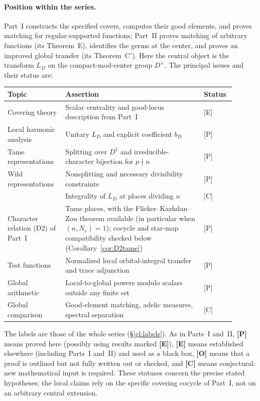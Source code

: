 \documentclass[11pt]{article}
\theoremstyle{plain}
\theoremstyle{definition}
\begin{document}
\paragraph{Position within the series.}
Part~I constructs the specified covers, computes their good elements, and
proves matching for regular-supported functions; Part~II proves matching of
arbitrary functions (its Theorem~E), identifies the germs at the center, and
proves an improved global transfer (its Theorem~C$'$). Here the central object
is the transform $L_D$ on the compact-mod-center group $D^\times$.
The principal issues and their status are:
\begin{center}
\small
\begin{tabular}{@{}p{0.23\linewidth}p{0.57\linewidth}p{0.10\linewidth}@{}}
\toprule
\textbf{Topic} & \textbf{Assertion} & \textbf{Status}\\
\midrule
Covering theory & Scalar centrality and good-locus description from Part~I & [E]\\
Local harmonic analysis & Unitary $L_D$ and explicit coefficient $b_D$ & [P]\\
Tame representations & Splitting over $D^1$ and irreducible-character bijection for $p\nmid n$ & [P]\\
Wild representations & Nonsplitting and necessary divisibility constraints & [P]\\
 & Integrality of $L_D$ at places dividing $n$ & [C]\\
Character relation (D2) of Part~I & Tame places, with the Flicker--Kazhdan--Zou theorem available (in particular when $(n,N_r)=1$); cocycle and star-map compatibility checked below (Corollary~\ref{cor:D2tame}) & [P]\\
Test functions & Normalized local orbital-integral transfer and trace adjunction & [P]\\
Global arithmetic & Local-to-global powers modulo scalars outside any finite set & [P]\\
Global comparison & Good-element matching, adelic measures, spectral separation & [C]\\
\bottomrule
\end{tabular}
\end{center}
The labels are those of the whole series (\S\ref{gl:labels}). As in Parts~I and~II, \textbf{[P]} means proved here (possibly using
results marked \textbf{[E]}), \textbf{[E]} means established elsewhere
(including Parts~I and~II) and used as a black box, \textbf{[O]} means that
a proof is outlined but not fully written out or checked, and \textbf{[C]}
means conjectural: new mathematical input is required.
These statuses concern the precise stated hypotheses; the local
claims rely on the specific covering cocycle of Part~I, not on
an arbitrary central extension.
\end{document}
